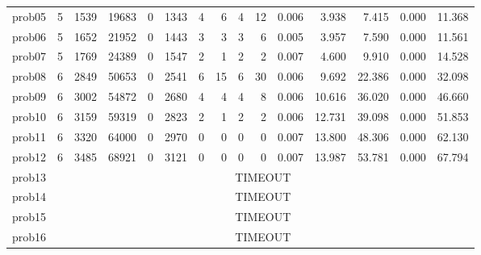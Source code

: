 \begin{table}[H]
{\begin{tabular}{lrrr rr rr rr rrrrr}
            prob05           & 5                                     & 1539            & 19683       & 0           & 1343         & 4 & 6  & 4 & 12 & 0.006 & 3.938  & 7.415  & 0.000 & 11.368 \\
            prob06           & 5                                     & 1652            & 21952       & 0           & 1443         & 3 & 3  & 3 & 6  & 0.005 & 3.957  & 7.590  & 0.000 & 11.561 \\
            prob07           & 5                                     & 1769            & 24389       & 0           & 1547         & 2 & 1  & 2 & 2  & 0.007 & 4.600  & 9.910  & 0.000 & 14.528 \\
            prob08           & 6                                     & 2849            & 50653       & 0           & 2541         & 6 & 15 & 6 & 30 & 0.006 & 9.692  & 22.386 & 0.000 & 32.098 \\
            prob09           & 6                                     & 3002            & 54872       & 0           & 2680         & 4 & 4  & 4 & 8  & 0.006 & 10.616 & 36.020 & 0.000 & 46.660 \\
            prob10           & 6                                     & 3159            & 59319       & 0           & 2823         & 2 & 1  & 2 & 2  & 0.006 & 12.731 & 39.098 & 0.000 & 51.853 \\
            prob11           & 6                                     & 3320            & 64000       & 0           & 2970         & 0 & 0  & 0 & 0  & 0.007 & 13.800 & 48.306 & 0.000 & 62.130 \\
            prob12           & 6                                     & 3485            & 68921       & 0           & 3121         & 0 & 0  & 0 & 0  & 0.007 & 13.987 & 53.781 & 0.000 & 67.794 \\
            prob13           & \multicolumn{14}{c}{TIMEOUT}                                                                                                                                    \\
            prob14           & \multicolumn{14}{c}{TIMEOUT}                                                                                                                                    \\
            prob15           & \multicolumn{14}{c}{TIMEOUT}                                                                                                                                    \\
            prob16           & \multicolumn{14}{c}{TIMEOUT}                                                                                                                                    \\

\end{tabular}}
\end{table}
